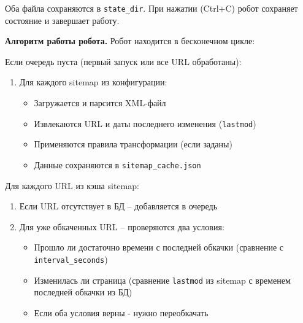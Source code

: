 Оба файла сохраняются в \texttt{state\_dir}. При нажатии (Ctrl+C) робот сохраняет состояние и завершает работу.


\vspace{1 em}
\noindent\textbf{Алгоритм работы робота.} Робот находится в бесконечном цикле:

Если очередь пуста (первый запуск или все URL обработаны):
\begin{enumerate}
    \item Для каждого sitemap из конфигурации:
    \begin{itemize}
        \item Загружается и парсится XML-файл
        \item Извлекаются URL и даты последнего изменения (\texttt{lastmod})
        \item Применяются правила трансформации (если заданы)
        \item Данные сохраняются в \texttt{sitemap\_cache.json}
    \end{itemize}
\end{enumerate}

Для каждого URL из кэша sitemap:
\begin{enumerate}
    \item Если URL отсутствует в БД -- добавляется в очередь
    \item Для уже обкаченных URL -- проверяются два условия:
    \begin{itemize}
        \item Прошло ли достаточно времени с последней обкачки (сравнение с \texttt{interval\_seconds})
        \item Изменилась ли страница (сравнение \texttt{lastmod} из sitemap с временем последней обкачки из БД)
        \item Если оба условия верны - нужно переобкачать
    \end{itemize}
\end{enumerate}


